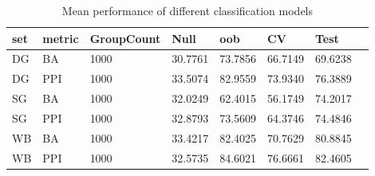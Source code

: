 \begin{table}
\centering
\begin{tabular}[0.2em]{@{}llllllll@{}}\toprule
set & metric & GroupCount & Null & oob & CV & Test\\\toprule[0.2em]
DG & BA & 1000 & 30.7761 & 73.7856 & 66.7149 & 69.6238 \\\midrule
DG & PPI & 1000 & 33.5074 & 82.9559 & 73.9340 & 76.3889 \\\midrule
SG & BA & 1000 & 32.0249 & 62.4015 & 56.1749 & 74.2017 \\\midrule
SG & PPI & 1000 & 32.8793 & 73.5609 & 64.3746 & 74.4846 \\\midrule
WB & BA & 1000 & 33.4217 & 82.4025 & 70.7629 & 80.8845 \\\midrule
WB & PPI & 1000 & 32.5735 & 84.6021 & 76.6661 & 82.4605 \\\bottomrule[0.2em]
\end{tabular}
\caption{Mean performance of different classification models\label{tabel:ClassificationMeanPerf}}
\end{table}
